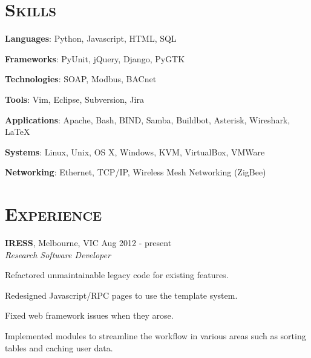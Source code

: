 \documentclass[line,margin]{res}
\begin{document}
    \address{ablack@fastmail.net}
    \address{0401 868 343}

    \begin{resume}
        \section{\textsc{Skills}}
        \begin{list}{}{\leftmargin=1em \itemsep=-2pt}
            \item{\textbf{Languages}: Python, Javascript, HTML, SQL}
            \item{\textbf{Frameworks}: PyUnit, jQuery, Django, PyGTK}
            \item{\textbf{Technologies}: SOAP, Modbus, BACnet}
            \item{\textbf{Tools}: Vim, Eclipse, Subversion, Jira}
            \item{\textbf{Applications}: Apache, Bash, BIND, Samba, Buildbot, Asterisk, Wireshark, \LaTeX}
            \item{\textbf{Systems}: Linux, Unix, OS X, Windows, KVM, VirtualBox, VMWare}
            \item{\textbf{Networking}: Ethernet, TCP/IP, Wireless Mesh Networking (ZigBee)}
        \end{list}

        \section{\textsc{Experience}} \textbf{IRESS}, Melbourne, VIC \hfill Aug 2012 - present \\
        \textit{Research Software Developer}
        \begin{list}{}{\leftmargin=1em \itemsep=-2pt}
            \item{Refactored unmaintainable legacy code for existing features.}
            \item{Redesigned Javascript/RPC pages to use the template system.}
            \item{Fixed web framework issues when they arose.}
            \item{Implemented modules to streamline the workflow in various areas such as sorting tables and caching user data.}
        \end{list}


\end{resume}
\end{document}
